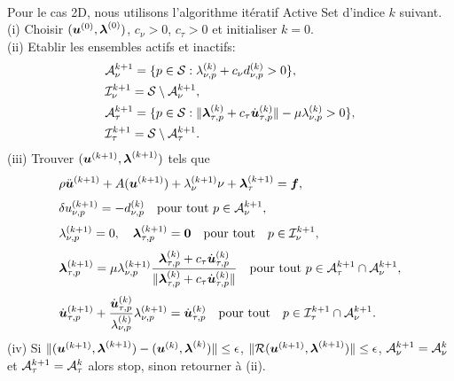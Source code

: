 \noindent {}\\

Pour le cas 2D, nous utilisons l'algorithme itératif Active Set d'indice $k$ suivant.\\
\qquad(i) Choisir $(\mbox{\boldmath{$u$}}^{(0)},\mbox{\boldmath{$\lambda$}}^{(0)})$, $c_{\nu}>0$, $c_\tau>0$ et initialiser $k=0$.\\[3mm]
\qquad(ii) Etablir les ensembles actifs et inactifs:
\begin{align*}
&{\cal A}_{\nu}^{k+1}=\{p\in {\cal S}:\lambda^{(k)}_{\nu,p}+c_{\nu} d^{(k)}_{\nu,p}> 0\},\\
&{\cal I}_{\nu}^{k+1}={\cal S}\setminus {\cal A}_{\nu}^{k+1},\\
&{\cal A}_{\tau}^{k+1}=\{p\in {\cal S}:\|\mbox{\boldmath{$\lambda$}}_{\tau, p}^{(k)}+c_\tau \dot{\mbox{\boldmath{$u$}}}_{\tau, p}^{(k)}\|-\mu \lambda_{\nu, p}^{(k)}> 0\},\\
&{\cal I}_{\tau}^{k+1}={\cal S}\setminus {\cal A}_{\tau}^{k+1}.
\end{align*}
(iii) Trouver $(\mbox{\boldmath{$u$}}^{(k+1) },\mbox{\boldmath{$\lambda$}}^{(k+1) })$ tels que
\begin{eqnarray}
& \rho \ddot{\mbox{\boldmath{$u$}}}^{(k+1)}+ A(\mbox{\boldmath{$u$}}^{(k+1)}) + \lambda_{\nu}^{(k+1)}\nu + \mbox{\boldmath{$\lambda$}}_{\tau}^{(k+1)}= \mbox{\boldmath{$f$}}, \\[1mm]
&\label{Anu}\delta u^{(k+1)}_{\nu,p} = -d^{(k)}_{\nu,p} \quad {\rm pour \ tout} \ p\in {\cal A}_{\nu}^{k+1},\\[1mm]
&\label{Inu}\lambda^{(k+1)}_{\nu,p}=0, \quad \mbox{\boldmath{$\lambda$}}^{(k+1)}_{\tau,p}=\mbox{\boldmath{$0$}} \quad {\rm pour \ tout} \quad p\in {\cal I}_{\nu}^{k+1},\\[1mm]
&\label{Atau}\mbox{\boldmath{$\lambda$}}_{\tau, p}^{(k+1)} = \mu \lambda_{\nu, p}^{(k+1)} \frac{\mbox{\boldmath{$\lambda$}}_{\tau, p}^{(k)}+c_\tau \dot{\mbox{\boldmath{$u$}}}_{\tau, p}^{(k)}}{\|\mbox{\boldmath{$\lambda$}}_{\tau, p}^{(k)}+c_\tau \dot{\mbox{\boldmath{$u$}}}_{\tau, p}^{(k)}\|} \quad {\rm pour \ tout} \ p\in {\cal A}_{\tau}^{k+1}\cap {\cal A}_{\nu}^{k+1},\\[1mm]
&\label{Itau1}\dot{\mbox{\boldmath{$u$}}}_{\tau, p}^{(k+1)}+\frac{\dot{\mbox{\boldmath{$u$}}}_{\tau, p}^{(k)}}{\lambda_{\nu, p}^{(k)}}\lambda_{\nu, p}^{(k+1)} =\dot{\mbox{\boldmath{$u$}}}_{\tau, p}^{(k)} \quad {\rm pour \ tout} \quad p\in {\cal I}_{\tau}^{k+1}\cap {\cal A}_{\nu}^{k+1}.
\end{eqnarray}
(iv) Si $\|(\mbox{\boldmath{$u$}}^{(k+1) },\mbox{\boldmath{$\lambda$}}^{(k+1)})-(\mbox{\boldmath{$u$}}^{(k) },\mbox{\boldmath{$\lambda$}}^{(k)})\|\leq\epsilon$, $\|{\cal R}(\mbox{\boldmath{$u$}}^{(k+1) },\mbox{\boldmath{$\lambda$}}^{(k+1)})\|\leq\epsilon$, ${\cal A}_{\nu}^{k+1}={\cal A}_{\nu}^{k}$ et ${\cal A}_{\tau}^{k+1}={\cal A}_{\tau}^{k}$ alors stop, sinon retourner à (ii).\\[1mm]


